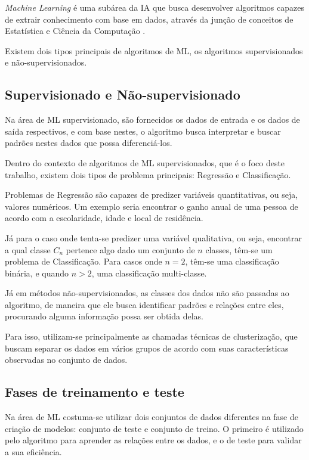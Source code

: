 \textit{Machine Learning} é uma subárea da IA que busca desenvolver algoritmos capazes de extrair conhecimento com base em dados, através da junção de conceitos de Estatística e Ciência da Computação \cite{James:2014:ISL:2517747}. 

Existem dois tipos principais de algoritmos de ML, os algoritmos supervisionados e não-supervisionados.

\subsection{Supervisionado e Não-supervisionado}

Na área de ML supervisionado, são fornecidos os dados de entrada e os dados de saída respectivos, e com base nestes, o algoritmo busca interpretar e buscar padrões nestes dados que possa diferenciá-los. 

Dentro do contexto de algoritmos de ML supervisionados, que é o foco deste trabalho, existem dois tipos de problema principais: Regressão e Classificação.

Problemas de Regressão são capazes de predizer variáveis quantitativas, ou seja, valores numéricos. Um exemplo seria encontrar o ganho anual de uma pessoa de acordo com a escolaridade, idade e local de residência. \cite{muller2017introduction} 

Já para o caso onde tenta-se predizer uma variável qualitativa, ou seja, encontrar a qual classe $C_{n}$ pertence algo dado um conjunto de $n$ classes, têm-se um problema de Classificação. Para casos onde $n=2$, têm-se uma classificação binária, e quando $n>2$, uma classificação multi-classe.

Já em métodos não-supervisionados, as classes dos dados não são passadas ao algoritmo, de maneira que ele busca identificar padrões e relações entre eles, procurando alguma informação possa ser obtida delas. 

Para isso, utilizam-se principalmente as chamadas técnicas de clusterização, que buscam separar os dados em vários grupos de acordo com suas características observadas no conjunto de dados. \cite{muller2017introduction} 

\subsection{Fases de treinamento e teste}

Na área de ML costuma-se utilizar dois conjuntos de dados diferentes na fase de criação de modelos: conjunto de teste e conjunto de treino. O primeiro é utilizado pelo algoritmo para aprender as relações entre os dados, e o de teste para validar a sua eficiência.

